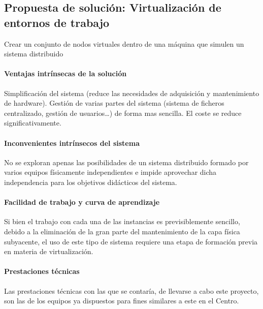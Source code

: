 \subsection{Propuesta de solución: Virtualización de entornos de trabajo}

Crear un conjunto de nodos virtuales dentro de una máquina que simulen un sistema distribuido

\paragraph{Ventajas intrínsecas de la solución\\}

Simplificación del sistema (reduce las necesidades de adquisición y mantenimiento de hardware).
Gestión de varias partes del sistema (sistema de ficheros centralizado, gestión de usuarios\dots) de forma mas sencilla. El coste se reduce significativamente.

\paragraph{Inconvenientes intrínsecos del sistema\\}

No se exploran apenas las posibilidades de un sistema distribuido formado por varios equipos físicamente independientes e impide aprovechar dicha independencia para los objetivos didácticos del sistema.

\paragraph{Facilidad de trabajo y curva de aprendizaje\\}

Si bien el trabajo con cada una de las instancias es previsiblemente sencillo, debido a la eliminación de la gran parte del mantenimiento de la capa física subyacente, el uso de este tipo de sistema requiere una etapa de formación previa en materia de virtualización.

\paragraph{Prestaciones técnicas\\}

Las prestaciones técnicas con las que se contaría, de llevarse a cabo este proyecto, son las de los equipos ya dispuestos para fines similares a este en el Centro.

